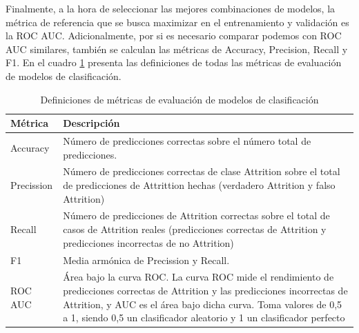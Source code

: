 Finalmente, a la hora de seleccionar las mejores combinaciones de modelos, la métrica de referencia que se busca maximizar en el entrenamiento y validación es la ROC AUC. Adicionalmente, por si es necesario comparar podemos con ROC AUC similares, también se calculan las métricas de Accuracy, Precision, Recall y F1. En el cuadro \ref{table:metrics} presenta las definiciones de todas las métricas de evaluación de modelos de clasificación.

\begin{table}[htbp]
\centering{}
\begin{tabular}{l p{10cm}}
\hline
\textbf{Métrica} & \textbf{Descripción} \\ \hline
Accuracy & Número de predicciones correctas sobre el número total de predicciones. \\ \hline
Precission & Número de predicciones correctas de clase Attrition sobre el total de predicciones de Attrittion hechas (verdadero Attrition y falso Attrition) \\ \hline
Recall & Número de predicciones de Attrition correctas sobre el total de casos de Attrition reales (predicciones correctas de Attrition y predicciones incorrectas de no Attrition) \\ \hline
F1 & Media armónica de Precission y Recall. \\ \hline
ROC AUC & Área bajo la curva ROC. La curva ROC mide el rendimiento de predicciones correctas de Attrition y las predicciones incorrectas de Attrition, y AUC es el área bajo dicha curva. Toma valores de 0,5 a 1, siendo 0,5 un clasificador aleatorio y 1 un clasificador perfecto \\ \hline
\end{tabular}
\caption{Definiciones de métricas de evaluación de modelos de clasificación}
\label{table:metrics}
\end{table}